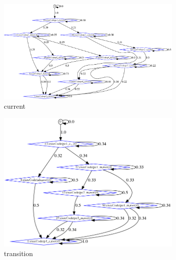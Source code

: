\begin{figure}[H]
\centering
\begin{subfigure}{.33\textwidth}
\includegraphics[width=\linewidth]{content/chapters/ch_background/sdn_analytics/2/figs/weightedGraphs/current_007_weighEdges.png}
\caption{current}
\label{fig:nra_curr}
\end{subfigure}%
\begin{subfigure}{.33\textwidth}
\includegraphics[width=\linewidth]{content/chapters/ch_background/sdn_analytics/2/figs/weightedGraphs/transition_007_weighEdges.png}
\caption{transition}
\label{fig:nra_trans}
\end{subfigure}%
\begin{subfigure}{.33\textwidth}

\end{subfigure}
\end{figure}
